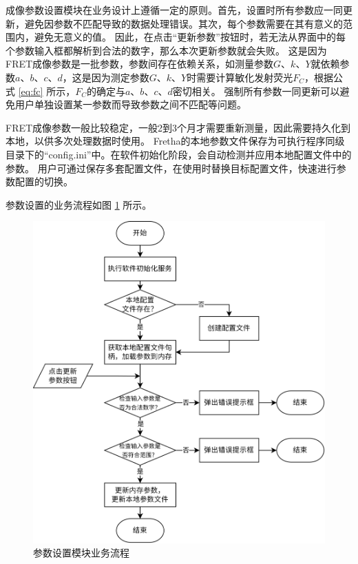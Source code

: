 成像参数设置模块在业务设计上遵循一定的原则。首先，设置时所有参数应一同更新，避免因参数不匹配导致的数据处理错误。其次，每个参数需要在其有意义的范围内，避免无意义的值。
因此，在点击“更新参数”按钮时，若无法从界面中的每个参数输入框都解析到合法的数字，那么本次更新参数就会失败。
这是因为FRET成像参数是一批参数，参数间存在依赖关系，如测量参数$G$、$k$、$Y$就依赖参数$a$、$b$、$c$、$d$，这是因为测定参数$G$、$k$、$Y$时需要计算敏化发射荧光$F_C$，根据公式 \ref{eq:fc} 所示，$F_C$的确定与$a$、$b$、$c$、$d$密切相关。
强制所有参数一同更新可以避免用户单独设置某一参数而导致参数之间不匹配等问题。

FRET成像参数一般比较稳定，一般2到3个月才需要重新测量，因此需要持久化到本地，以供多次处理数据时使用。
Fretha的本地参数文件保存为可执行程序同级目录下的“config.ini”中。在软件初始化阶段，会自动检测并应用本地配置文件中的参数。
用户可通过保存多套配置文件，在使用时替换目标配置文件，快速进行参数配置的切换。

参数设置的业务流程如图 \ref{fig:fretha_param_module_flow} 所示。

\begin{figure}[hbtp]
    \centering
    \includegraphics[height=1\linewidth]{../figures/2/2_成像参数设置模块业务流程.png}
    \caption{参数设置模块业务流程}
    \label{fig:fretha_param_module_flow}
\end{figure}
\fi

